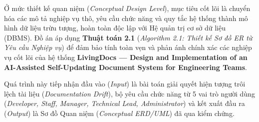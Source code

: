 



Ở mức thiết kế quan niệm (\textit{Conceptual Design Level}), mục tiêu cốt lõi là chuyển hóa các mô tả nghiệp vụ thô, yêu cầu chức năng và quy tắc hệ thống thành mô hình dữ liệu trừu tượng, hoàn toàn độc lập với Hệ quản trị cơ sở dữ liệu (DBMS). Đồ án áp dụng \textbf{Thuật toán 2.1} (\textit{Algorithm 2.1: Thiết kế Sơ đồ ER từ Yêu cầu Nghiệp vụ}) để đảm bảo tính toàn vẹn và phản ánh chính xác các nghiệp vụ cốt lõi của hệ thống \textbf{LivingDocs — Design and Implementation of an AI-Assisted Self-Updating Document System for Engineering Teams}.

Quá trình này tiếp nhận đầu vào (\textit{Input}) là bài toán giải quyết hiện tượng trôi lệch tài liệu (\textit{Documentation Drift}), bộ yêu cầu chức năng từ 5 vai trò người dùng (\textit{Developer, Staff, Manager, Technical Lead, Administrator}) và kết xuất đầu ra (\textit{Output}) là Sơ đồ Quan niệm (\textit{Conceptual ERD/UML}) đã qua kiểm chứng.









